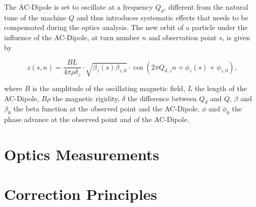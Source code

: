 The AC-Dipole is set to oscillate at a frequency $Q_d$, different from the natural tune of the machine $Q$ and thus introduces systematic effects that needs to be compensated during the optics analysis. The new orbit of a particle under the influence of the AC-Dipole, at turn number $n$ and observation point $s$, is given by~\cite{serrano_lhc_nodate}

\begin{equation}
z(s, n) = \frac{BL}{4\pi\rho\delta_z} \cdot \sqrt{\beta_z(s) \beta_{z,0}} \cdot \cos \left( 2 \pi Q_{d,z}n + \phi_z(s) + \phi_{z,0}\right),
\label{eq:ac_dipole}
\end{equation}

where $B$ is the amplitude of the oscillating magnetic field, $L$ the length of the AC-Dipole, $B\rho$ the magnetic rigidity, $\delta$ the difference between $Q_d$ and $Q$, $\beta$ and $\beta_0$ the beta function at the observed point and the AC-Dipole, $\phi$ and $\phi_0$ the phase advance at the observed point and of the AC-Dipole.

\section{Optics Measurements}




\section{Correction Principles}


